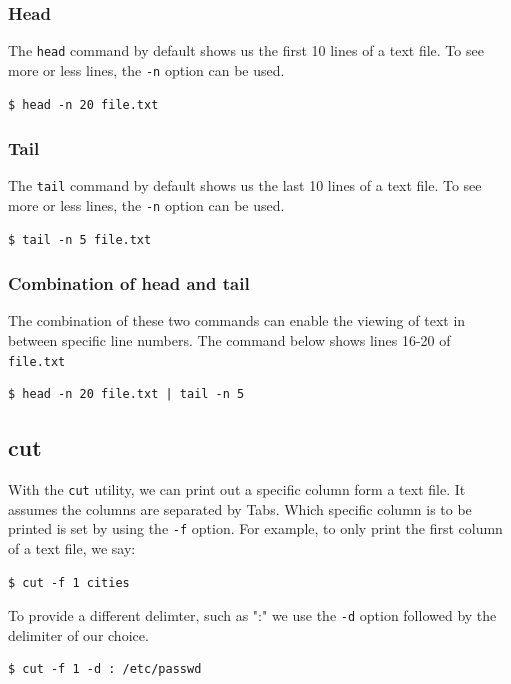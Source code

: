 \subsubsection{Head}
The \verb|head| command by default shows us the first 10 lines of a text file. To see more or less lines, the \verb|-n| option can be used.

\begin{verbatim}
$ head -n 20 file.txt
\end{verbatim}

\subsubsection{Tail}
The \verb|tail| command by default shows us the last 10 lines of a text file. To see more or less lines, the \verb|-n| option can be used.

\begin{verbatim}
$ tail -n 5 file.txt
\end{verbatim}

\subsubsection{Combination of head and tail}
The combination of these two commands can enable the viewing of text in between specific line numbers. The command below shows lines 16-20 of \texttt{file.txt}

\begin{verbatim}
$ head -n 20 file.txt | tail -n 5
\end{verbatim}

\subsection{cut}
With the \verb|cut| utility, we can print out a specific column form a text file. It assumes the columns are separated by Tabs. Which specific column is to be printed is set by using the \verb|-f| option. For example, to only print the first column of a text file, we say:

\begin{verbatim}
$ cut -f 1 cities
\end{verbatim}

\noindent
To provide a different delimter, such as ":" we use the \verb|-d| option followed by the delimiter of our choice. 

\begin{verbatim}
$ cut -f 1 -d : /etc/passwd
\end{verbatim}

